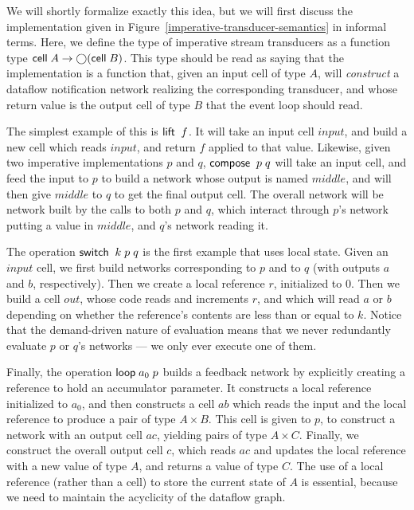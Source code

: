 We will shortly formalize exactly this idea, but we will first discuss
the implementation given in
Figure~\ref{imperative-transducer-semantics} in informal terms. Here,
we define the type of imperative stream transducers as a function type
$\mathsf{cell}\;{A} \to \bigcirc{(\mathsf{cell}\;{B})}$. This type should be read as
saying that the implementation is a function that, given an input cell
of type $A$, will \emph{construct} a dataflow notification network
realizing the corresponding transducer, and whose return value is the
output cell of type $B$ that the event loop should read. 

The simplest example of this is $\mathsf{lift}\;\;f$. It will take an input
cell $input$, and build a new cell which reads $input$, and return $f$
applied to that value. Likewise, given two imperative implementations $p$
and $q$, $\mathsf{compose}\;\;p\;q$ will take an input cell, and feed the
input to $p$ to build a network whose output is named $middle$, and
will then give $middle$ to $q$ to get the final output cell. The
overall network will be network built by the calls to both $p$ and
$q$, which interact through $p$'s network putting a value in $middle$,
and $q$'s network reading it.

The operation $\mathsf{switch}\;\;k\;p\;q$ is the first example that uses 
local state. Given an $input$ cell, we first build networks corresponding
to $p$ and to $q$ (with outputs $a$ and $b$, respectively). Then we
create a local reference $r$, initialized to $0$. Then we build a cell $out$,
whose code reads and increments $r$, and which will read $a$ or $b$ depending
on whether the reference's contents are less than or equal to $k$. Notice
that the demand-driven nature of evaluation means that we never redundantly
evaluate $p$ or $q$'s networks --- we only ever execute one of them. 

Finally, the operation $\mathsf{loop}\; a_0\;p$ builds a feedback network by
explicitly creating a reference to hold an accumulator parameter. It
constructs a local reference initialized to $a_0$, and then constructs
a cell $ab$ which reads the input and the local reference to produce a
pair of type $A \times B$. This cell is given to $p$, to construct a
network with an output cell $ac$, yielding pairs of type $A \times
C$. Finally, we construct the overall output cell $c$, which reads
$ac$ and updates the local reference with a new value of type $A$, and
returns a value of type $C$. The use of a local reference (rather than
a cell) to store the current state of $A$ is essential, because we need
to maintain the acyclicity of the dataflow graph. 

